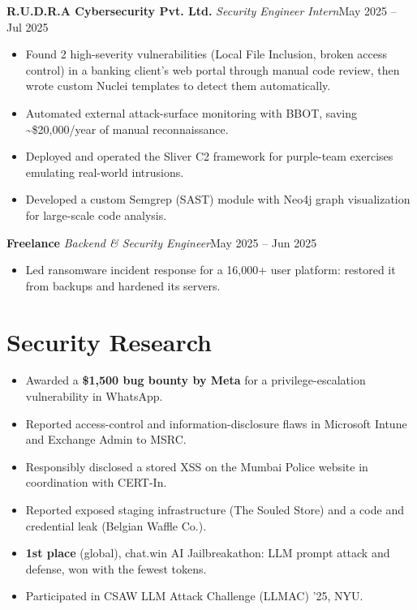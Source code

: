 \documentclass[10pt, a4paper]{article}
\newcommand{\role}[3]{\par\vspace{2.5pt}\textbf{#1} \textbar{} \textit{#2}\hfill #3\par}
\begin{document}
\role{R.U.D.R.A Cybersecurity Pvt. Ltd.}{Security Engineer Intern}{May 2025 -- Jul 2025}
\begin{itemize}
  \item Found 2 high-severity vulnerabilities (Local File Inclusion, broken access control) in a banking client's web
  portal through manual code review, then wrote custom Nuclei templates to detect them automatically.
  \item Automated external attack-surface monitoring with BBOT, saving \textasciitilde{}\$20,000/year of manual reconnaissance.
  \item Deployed and operated the Sliver C2 framework for purple-team exercises emulating real-world intrusions.
  \item Developed a custom Semgrep (SAST) module with Neo4j graph visualization for large-scale code analysis.
\end{itemize}

\role{Freelance}{Backend \& Security Engineer}{May 2025 -- Jun 2025}
\begin{itemize}
  \item Led ransomware incident response for a 16,000+ user platform: restored it from backups and hardened its servers.
\end{itemize}

\section{Security Research}
\begin{itemize}
  \item Awarded a \textbf{\$1,500 bug bounty by Meta} for a privilege-escalation vulnerability in WhatsApp.
  \item Reported access-control and information-disclosure flaws in Microsoft Intune and Exchange Admin to MSRC.
  \item Responsibly disclosed a stored XSS on the Mumbai Police website in coordination with CERT-In.
  \item Reported exposed staging infrastructure (The Souled Store) and a code and credential leak (Belgian Waffle Co.).
  \item \textbf{1st place} (global), chat.win AI Jailbreakathon: LLM prompt attack and defense, won with the fewest tokens.
  \item Participated in CSAW LLM Attack Challenge (LLMAC) '25, NYU.
\end{itemize}
\end{document}
